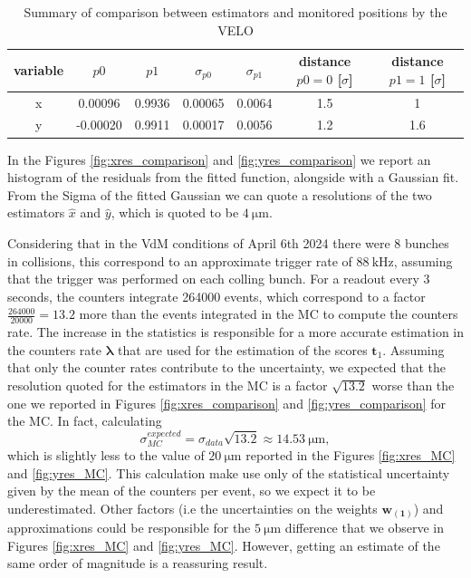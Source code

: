 \begin{table}
    \centering
    \begin{tabular}{c|c|c|c|c|c|c}
    variable  & $p0$ & $p1$ & $\sigma_{p0}$ & $\sigma_{p1}$ & distance $p0=0$ [$\sigma$] & distance $p1=1$ [$\sigma$]\\
    \hline
       x  & 0.00096 & 0.9936 & 0.00065 & 0.0064 & 1.5 & 1\\
       y  & -0.00020 & 0.9911 & 0.00017 & 0.0056 & 1.2 & 1.6 
    \end{tabular}
    \caption{Summary of comparison between estimators and monitored positions by the VELO}
    \label{tab:summary}
\end{table}

In the Figures \ref{fig:xres_comparison} and \ref{fig:yres_comparison} we report an histogram of the residuals from the fitted function, alongside with a Gaussian fit. From the Sigma of the fitted Gaussian we can quote a resolutions of the two estimators $\hat{x}$ and $\hat{y}$, which is quoted to be $\SI{4}{\micro\meter}$.

Considering that in the VdM conditions of April 6th 2024 there were 8 bunches in collisions, this correspond to an approximate trigger rate of $\SI{88}{\kilo\hertz}$, assuming that the trigger was performed on each colling bunch. For a readout every 3 seconds, the counters integrate 264000 events, which correspond to a factor $\tfrac{264000}{20000}=13.2$ more than the events integrated in the MC to compute the counters rate.  The increase in the statistics is responsible for a more accurate estimation in the counters rate $\mathbf{\lambda}$ that are used for the estimation of the scores $\mathbf{t}_{1}$. Assuming that only the counter rates contribute to the uncertainty, we expected that the resolution quoted for the estimators in the MC is a factor $\sqrt{13.2}$ worse than the one we reported in Figures \ref{fig:xres_comparison} and \ref{fig:yres_comparison} for the MC. In fact, calculating
\begin{equation}
    \sigma_{MC}^{expected} = \sigma_{data}\sqrt{13.2} \approx \SI{14.53}{\micro\meter},
\end{equation}
which is slightly less to the value of $\SI{20}{\micro\meter}$ reported in the Figures  \ref{fig:xres_MC} and \ref{fig:yres_MC}. This calculation make use only of the statistical uncertainty given by the mean of the counters per event, so we expect it to be underestimated. Other factors (i.e the uncertainties on the weights $\mathbf{w_{(1)}}$) and approximations could be responsible for the $\SI{5}{\micro\meter}$ difference that we observe in Figures  \ref{fig:xres_MC} and \ref{fig:yres_MC}. However, getting an estimate of the same order of magnitude is a reassuring result.

